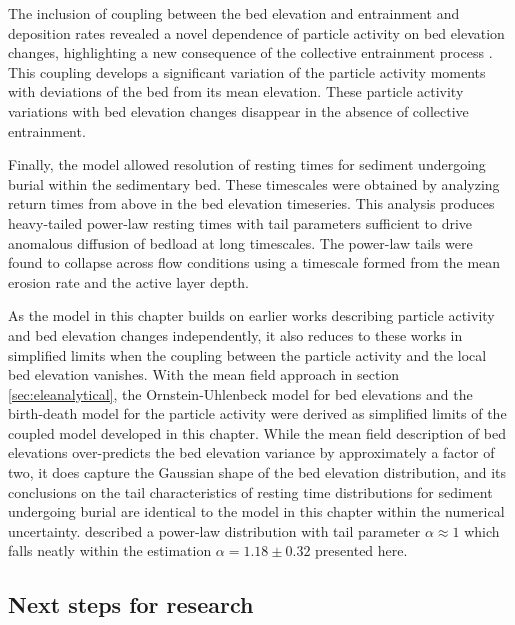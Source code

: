 The inclusion of coupling between the bed elevation and entrainment and deposition rates revealed a novel dependence of particle activity on bed elevation changes, highlighting a new consequence of the collective entrainment process \citep{Ancey2008,Lee2018}. This coupling develops a significant variation of the particle activity moments with deviations of the bed from its mean elevation. These particle activity variations with bed elevation changes disappear in the absence of collective entrainment.

Finally, the model allowed resolution of resting times for sediment undergoing burial within the sedimentary bed. These timescales were obtained by analyzing return times from above in the bed elevation timeseries.
This analysis produces heavy-tailed power-law resting times with tail parameters sufficient to drive anomalous diffusion of bedload at long timescales.
The power-law tails were found to collapse across flow conditions using a timescale formed from the mean erosion rate and the active layer depth.

As the model in this chapter builds on earlier works describing particle activity and bed elevation changes independently, it also reduces to these works in simplified limits when the coupling between the particle activity and the local bed elevation vanishes.
With the mean field approach in section \ref{sec:eleanalytical}, the \citet{Martin2014} Ornstein-Uhlenbeck model for bed elevations and the \citet{Ancey2008} birth-death model for the particle activity were derived as simplified limits of the coupled model developed in this chapter.
While the mean field description of bed elevations over-predicts the bed elevation variance by approximately a factor of two, it does capture the Gaussian shape of the bed elevation distribution, and its conclusions on the tail characteristics of resting time distributions for sediment undergoing burial are identical to the model in this chapter within the numerical uncertainty.
\citet{Martin2014} described a power-law distribution with tail parameter $\alpha \approx 1$ which falls neatly within the estimation $\alpha = 1.18 \pm 0.32$ presented here.


\subsection{Next steps for research}


